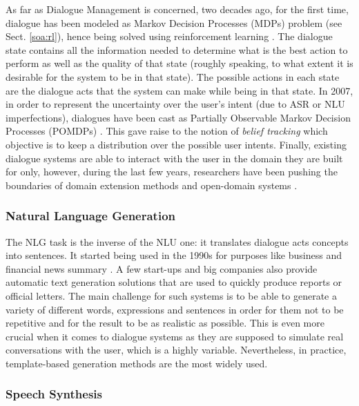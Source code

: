                         As far as Dialogue Management is concerned, two decades ago, for the first time, dialogue has been modeled as Markov Decision Processes (MDPs) problem (see Sect. \ref{soa:rl}), hence being solved using reinforcement learning \cite{Levin1997a}. The dialogue state contains all the information needed to determine what is the best action to perform as well as the quality of that state (roughly speaking, to what extent it is desirable for the system to be in that state). The possible actions in each state are the dialogue acts that the system can make while being in that state. In 2007, in order to represent the uncertainty over the user's intent (due to ASR or NLU imperfections), dialogues have been cast as Partially Observable Markov Decision Processes (POMDPs) \cite{Williams2007}. This gave raise to the notion of \textit{belief tracking} which objective is to keep a distribution over the possible user intents. Finally, existing dialogue systems are able to interact with the user in the domain they are built for only, however, during the last few years, researchers have been pushing the boundaries of domain  extension methods \cite{Gasic2013} and open-domain systems \cite{Pakucs2003,EkeinhorKomi2014,Wang2014}.
                        
                        \subsubsection{Natural Language Generation}
                        
                        The NLG task is the inverse of the NLU one: it translates dialogue acts concepts into sentences. It started being used in the 1990s for purposes like business and financial news summary \cite{Anand1992}. A few start-ups and big companies also provide automatic text generation solutions that are used to quickly produce reports or official letters. The main challenge for such systems is to be able to generate a variety of different words, expressions and sentences in order for them not to be repetitive and for the result to be as realistic as possible. This is even more crucial when it comes to dialogue systems as they are supposed to simulate real conversations with the user, which is a highly variable. Nevertheless, in practice, template-based generation methods are the most widely used.
                        
                        \subsubsection{Speech Synthesis}

